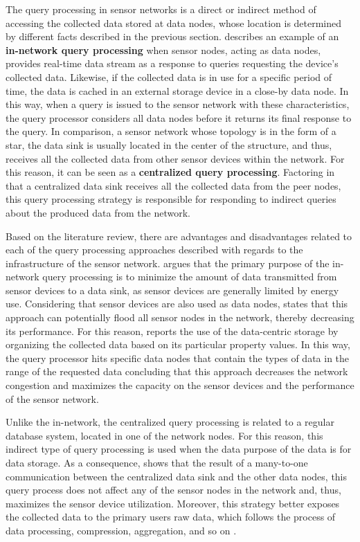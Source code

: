 The query processing in sensor networks is a direct or indirect method of
accessing the collected data stored at data nodes, whose location is determined
by different facts described in the previous section. \cite{sn-storage03}
describes an example of an \textbf{in-network query processing} when sensor
nodes, acting as data nodes, provides real-time data stream as a response
to queries requesting the device's collected data. Likewise, if the collected
data is in use for a specific period of time, the data is cached in an external
storage device in a close-by data node. In this way, when a query is issued to
the sensor network with these characteristics, the query processor considers 
all data nodes before it returns its final response to the query. In comparison, a sensor
network whose topology is in the form of a star, the data sink is usually
located in the center of the structure, and thus, receives all
the collected data from other sensor devices within the network. For this reason, it 
can be seen as a \textbf{centralized query processing}. Factoring in that a centralized data
sink receives all the collected data from the peer nodes, this query processing
strategy is responsible for responding to indirect queries about the
produced data from the network. 

Based on the literature review, there are advantages and disadvantages related to
each of the query processing approaches described with regards to the
infrastructure of the sensor network. \cite{sn-storage03} argues that the 
primary purpose of the in-network query processing is to minimize the amount
of data transmitted from sensor devices to a data sink, as sensor devices are
generally limited by energy use. Considering that sensor devices are also used
as data nodes, \cite{sn-storage04} states that this approach can potentially
flood all sensor nodes in the network, thereby decreasing its performance.
For this reason, \cite{sn-storage01} reports the use of the data-centric
storage by organizing the collected data based on its particular property
values. In this way, the query processor hits specific data nodes that contain
the types of data in the range of the requested data concluding that this approach 
decreases the network congestion and maximizes the
capacity on the sensor devices and the performance of the sensor network.

Unlike the in-network, the centralized query processing is related to a regular
database system, located in one of the network nodes. For this reason, this
indirect type of query processing is used when the data purpose of the data is for 
data storage. As a consequence, \cite{sn-storage02} shows that the result of
a many-to-one communication between the centralized data sink
and the other data nodes, this query process does not affect any of the sensor
nodes in the network and, thus, maximizes the sensor device utilization. 
Moreover, this strategy better exposes the collected data to the primary users
raw data, which follows the process of data processing, compression,
aggregation, and so on \cite{sn-db-modeling02}.

